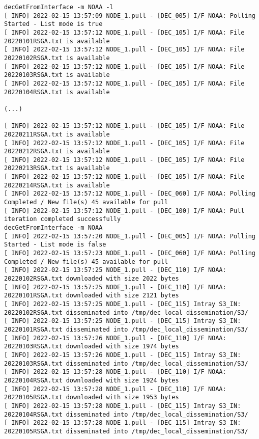 \documentclass[dec_sum_main.tex]{subfiles}
\begin{document}
	\begin{Verbatim}[fontsize=\tiny]
decGetFromInterface -m NOAA -l
[ INFO] 2022-02-15 13:57:09 NODE_1.pull - [DEC_005] I/F NOAA: Polling Started - List mode is true
[ INFO] 2022-02-15 13:57:12 NODE_1.pull - [DEC_105] I/F NOAA: File 20220101RSGA.txt is available
[ INFO] 2022-02-15 13:57:12 NODE_1.pull - [DEC_105] I/F NOAA: File 20220102RSGA.txt is available
[ INFO] 2022-02-15 13:57:12 NODE_1.pull - [DEC_105] I/F NOAA: File 20220103RSGA.txt is available
[ INFO] 2022-02-15 13:57:12 NODE_1.pull - [DEC_105] I/F NOAA: File 20220104RSGA.txt is available

(...)

[ INFO] 2022-02-15 13:57:12 NODE_1.pull - [DEC_105] I/F NOAA: File 20220211RSGA.txt is available
[ INFO] 2022-02-15 13:57:12 NODE_1.pull - [DEC_105] I/F NOAA: File 20220212RSGA.txt is available
[ INFO] 2022-02-15 13:57:12 NODE_1.pull - [DEC_105] I/F NOAA: File 20220213RSGA.txt is available
[ INFO] 2022-02-15 13:57:12 NODE_1.pull - [DEC_105] I/F NOAA: File 20220214RSGA.txt is available
[ INFO] 2022-02-15 13:57:12 NODE_1.pull - [DEC_060] I/F NOAA: Polling Completed / New file(s) 45 available for pull
[ INFO] 2022-02-15 13:57:12 NODE_1.pull - [DEC_100] I/F NOAA: Pull iteration completed successfully
decGetFromInterface -m NOAA
[ INFO] 2022-02-15 13:57:20 NODE_1.pull - [DEC_005] I/F NOAA: Polling Started - List mode is false
[ INFO] 2022-02-15 13:57:23 NODE_1.pull - [DEC_060] I/F NOAA: Polling Completed / New file(s) 45 available for pull
[ INFO] 2022-02-15 13:57:25 NODE_1.pull - [DEC_110] I/F NOAA: 20220102RSGA.txt downloaded with size 2022 bytes
[ INFO] 2022-02-15 13:57:25 NODE_1.pull - [DEC_110] I/F NOAA: 20220101RSGA.txt downloaded with size 2121 bytes
[ INFO] 2022-02-15 13:57:25 NODE_1.pull - [DEC_115] Intray S3_IN: 20220102RSGA.txt disseminated into /tmp/dec_local_dissemination/S3/
[ INFO] 2022-02-15 13:57:25 NODE_1.pull - [DEC_115] Intray S3_IN: 20220101RSGA.txt disseminated into /tmp/dec_local_dissemination/S3/
[ INFO] 2022-02-15 13:57:26 NODE_1.pull - [DEC_110] I/F NOAA: 20220103RSGA.txt downloaded with size 1974 bytes
[ INFO] 2022-02-15 13:57:26 NODE_1.pull - [DEC_115] Intray S3_IN: 20220103RSGA.txt disseminated into /tmp/dec_local_dissemination/S3/
[ INFO] 2022-02-15 13:57:28 NODE_1.pull - [DEC_110] I/F NOAA: 20220104RSGA.txt downloaded with size 1924 bytes
[ INFO] 2022-02-15 13:57:28 NODE_1.pull - [DEC_110] I/F NOAA: 20220105RSGA.txt downloaded with size 1953 bytes
[ INFO] 2022-02-15 13:57:28 NODE_1.pull - [DEC_115] Intray S3_IN: 20220104RSGA.txt disseminated into /tmp/dec_local_dissemination/S3/
[ INFO] 2022-02-15 13:57:28 NODE_1.pull - [DEC_115] Intray S3_IN: 20220105RSGA.txt disseminated into /tmp/dec_local_dissemination/S3/


\end{Verbatim}
\end{document}

